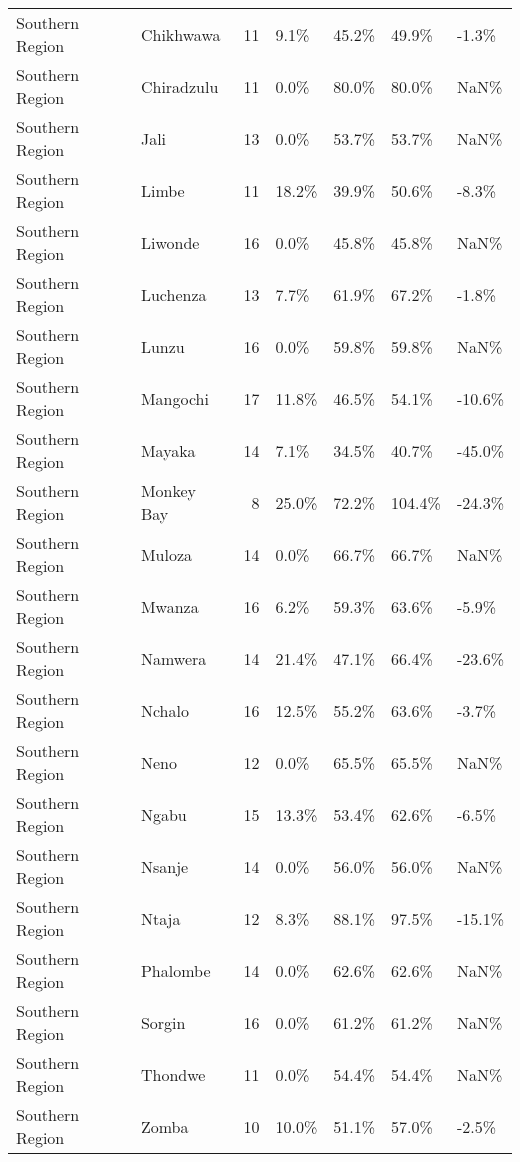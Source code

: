 \begin{table}[ht]
\begin{tabular}{llrllll}
  Southern Region & Chikhwawa &  11 & 9.1\% & 45.2\% & 49.9\% & -1.3\% \\ 
  Southern Region & Chiradzulu &  11 & 0.0\% & 80.0\% & 80.0\% & NaN\% \\ 
  Southern Region & Jali &  13 & 0.0\% & 53.7\% & 53.7\% & NaN\% \\ 
  Southern Region & Limbe &  11 & 18.2\% & 39.9\% & 50.6\% & -8.3\% \\ 
  Southern Region & Liwonde &  16 & 0.0\% & 45.8\% & 45.8\% & NaN\% \\ 
  Southern Region & Luchenza &  13 & 7.7\% & 61.9\% & 67.2\% & -1.8\% \\ 
  Southern Region & Lunzu &  16 & 0.0\% & 59.8\% & 59.8\% & NaN\% \\ 
  Southern Region & Mangochi &  17 & 11.8\% & 46.5\% & 54.1\% & -10.6\% \\ 
  Southern Region & Mayaka &  14 & 7.1\% & 34.5\% & 40.7\% & -45.0\% \\ 
  Southern Region & Monkey Bay &   8 & 25.0\% & 72.2\% & 104.4\% & -24.3\% \\ 
  Southern Region & Muloza &  14 & 0.0\% & 66.7\% & 66.7\% & NaN\% \\ 
  Southern Region & Mwanza &  16 & 6.2\% & 59.3\% & 63.6\% & -5.9\% \\ 
  Southern Region & Namwera &  14 & 21.4\% & 47.1\% & 66.4\% & -23.6\% \\ 
  Southern Region & Nchalo &  16 & 12.5\% & 55.2\% & 63.6\% & -3.7\% \\ 
  Southern Region & Neno &  12 & 0.0\% & 65.5\% & 65.5\% & NaN\% \\ 
  Southern Region & Ngabu &  15 & 13.3\% & 53.4\% & 62.6\% & -6.5\% \\ 
  Southern Region & Nsanje &  14 & 0.0\% & 56.0\% & 56.0\% & NaN\% \\ 
  Southern Region & Ntaja &  12 & 8.3\% & 88.1\% & 97.5\% & -15.1\% \\ 
  Southern Region & Phalombe &  14 & 0.0\% & 62.6\% & 62.6\% & NaN\% \\ 
  Southern Region & Sorgin &  16 & 0.0\% & 61.2\% & 61.2\% & NaN\% \\ 
  Southern Region & Thondwe &  11 & 0.0\% & 54.4\% & 54.4\% & NaN\% \\ 
  Southern Region & Zomba &  10 & 10.0\% & 51.1\% & 57.0\% & -2.5\% \\ 
   \hline
\end{tabular}
\end{table}
